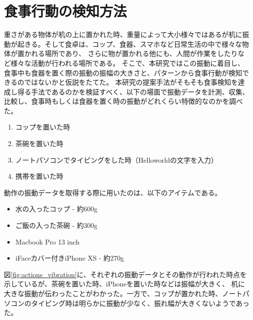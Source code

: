 \section{食事行動の検知方法}

重さがある物体が机の上に置かれた時、重量によって大小様々ではあるが机に振動が起きる。そして食卓は、コップ、食器、スマホなど日常生活の中で様々な物体が置かれる場所であり、
さらに物が置かれる他にも、人間が作業をしたりなど様々な活動が行われる場所である。
そこで、本研究ではこの振動に着目し、食事中も食器を置く際の振動の振幅の大きさと、パターンから食事行動が検知できるのではないかと仮説をたてた。
本研究の提案手法がそもそも食事検知を達成し得る手法であるのかを検証すべく、以下の場面で振動データを計測、収集、比較し、食事時もしくは食器を置く時の振動がどれくらい特徴的なのかを調べた。

\begin{enumerate}
  \item コップを置いた時
  \item 茶碗を置いた時
  \item ノートパソコンでタイピングをした時（Helloworldの文字を入力）
  \item 携帯を置いた時
\end{enumerate}

動作の振動データを取得する際に用いたのは、以下のアイテムである。

\begin{itemize}
  \item 水の入ったコップ - 約600g
  \item ご飯の入った茶碗 - 約300g
  \item Macbook Pro 13 inch
  \item iFaceカバー付きiPhone XS - 約270g
\end{itemize}

図\ref{fig:actions_vibration}に、それぞれの振動データとその動作が行われた時点を示しているが、茶碗を置いた時、iPhoneを置いた時などは振幅が大きく、
机に大きな振動が伝わったことがわかった。一方で、コップが置かれた時、ノートパソコンのタイピング時は明らかに振動が少なく、振れ幅が大きくないようであった。

